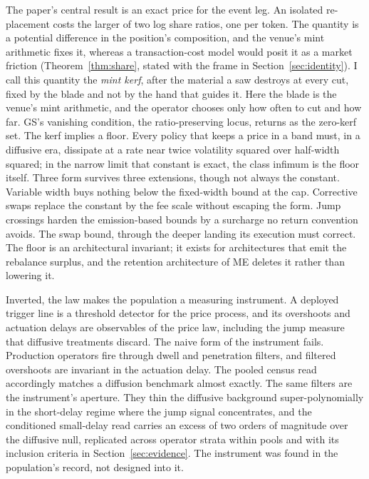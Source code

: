 \documentclass[11pt,a4paper]{article}
\theoremstyle{definition}
\theoremstyle{plain}
\theoremstyle{remark}
\begin{document}
The paper's central result is an exact price for the event leg. An isolated re-placement costs the larger of two log share ratios, one per token.
The quantity is a potential difference in the position's composition, and the venue's mint arithmetic fixes it, whereas a transaction-cost model would posit 
it as a market friction (Theorem~\ref{thm:share}, stated with the frame in Section~\ref{sec:identity}). I call this quantity the \emph{mint kerf}, after 
the material a saw destroys at every cut, fixed by the blade and not by the hand that guides it. Here the blade is the venue's mint arithmetic, and the 
operator chooses only how often to cut and how far. GS's vanishing condition, the ratio-preserving locus, returns as the zero-kerf set. The kerf implies 
a floor. Every policy that keeps a price in a band must, in a diffusive era, dissipate at a rate near twice volatility squared over half-width squared; 
in the narrow limit that constant is exact, the class infimum is the floor itself. Three form survives three extensions, though not always the constant. Variable width buys nothing 
below the fixed-width bound at the cap. Corrective swaps replace the constant by the fee scale without escaping the form. Jump crossings harden the
emission-based bounds by a surcharge no return convention avoids. The swap bound, through the deeper landing its execution must correct. The floor is an 
architectural invariant; it exists for architectures that emit the rebalance surplus, and the retention architecture of ME deletes it rather than
lowering it.

Inverted, the law makes the population a measuring instrument. A deployed trigger line is a threshold detector for the price process, and its overshoots 
and actuation delays are observables of the price law, including the jump measure that diffusive treatments discard. The naive form of the instrument fails. 
Production operators fire through dwell and penetration filters, and filtered overshoots are invariant in the actuation delay. The pooled census read
accordingly matches a diffusion benchmark almost exactly. The same filters are the instrument's aperture. They thin the diffusive background 
super-polynomially in the short-delay regime where the jump signal concentrates, and the conditioned small-delay read carries an excess of two orders of 
magnitude over the diffusive null, replicated across operator strata within pools and with its inclusion criteria in Section~\ref{sec:evidence}. The 
instrument was found in the population's record, not designed into it.
\end{document}
